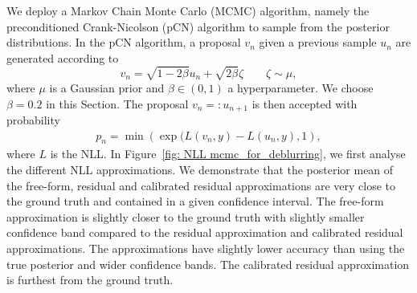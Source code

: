 \documentclass{amsart}
\theoremstyle{definition}
\begin{document}
We deploy a Markov Chain Monte Carlo (MCMC) algorithm, namely the preconditioned Crank-Nicolson (pCN) \cite{NicklRichard2023Bnsi, Taghizadeh2025Bayesian} algorithm to sample from the posterior distributions. In the pCN algorithm, a proposal $v_n$ given a previous sample $u_n$ are generated according to
\begin{equation*}
    v_n = \sqrt{1-2\beta} u_n + \sqrt{2 \beta} \zeta \qquad \zeta \sim \mu,
\end{equation*}
where $\mu$ is a Gaussian prior and $\beta \in (0, 1)$ a hyperparameter. We choose $\beta = 0.2$ in this Section. The proposal $v_n =: u_{n+1}$ is then accepted with probability 
\begin{eqnarray*}
    p_n = \min\left(\exp(L(v_n, y)-L(u_n, y), 1 \right),
\end{eqnarray*}
where $L$ is the NLL.
In Figure~\ref{fig: NLL mcmc_for_deblurring}, we first analyse the different NLL approximations. We demonstrate that the posterior mean of the free-form, residual and calibrated residual approximations are very close to the ground truth and contained in a given confidence interval. The free-form approximation is slightly closer to the ground truth with slightly smaller confidence band compared to the residual approximation and calibrated residual approximations. The approximations have slightly lower accuracy than using the true posterior and wider confidence bands. The calibrated residual approximation is furthest from the ground truth.
\end{document}
